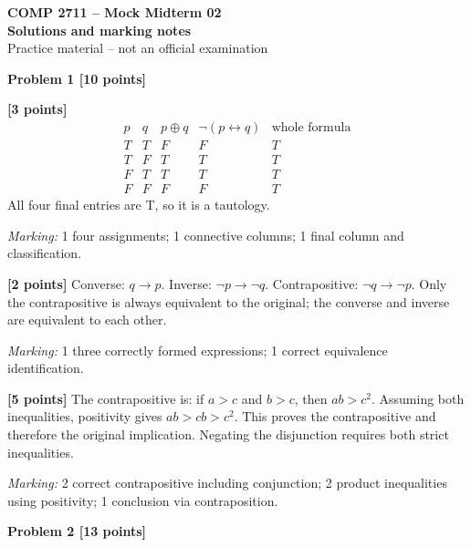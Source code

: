 \documentclass[12pt,letterpaper]{article}
\newcommand{\problemheading}[2][5\baselineskip]{\Needspace{#1}\par\noindent\hspace*{-0.625in}\textbf{#2}\par\nobreak\vspace{0.3em}}
\begin{document}
\begin{center}\textbf{COMP 2711 -- Mock Midterm 02}\\{\large\bfseries Solutions and marking notes}\\Practice material -- not an official examination\end{center}\vspace{0.5em}
\problemheading[\dimexpr 3\baselineskip+4\baselineskip\relax]{Problem 1 [10 points]}
\begin{description}[font=\normalfont,leftmargin=1.2em,labelsep=0.4em]
\item[(a)] \textbf{[3 points]} \[\begin{array}{cc|cc|c}p&q&p\oplus q&\neg(p\leftrightarrow q)&\text{whole formula}\\\hline T&T&F&F&T\\T&F&T&T&T\\F&T&T&T&T\\F&F&F&F&T\end{array}\] All four final entries are T, so it is a tautology.
\par\textit{Marking:} 1 four assignments; 1 connective columns; 1 final column and classification.
\item[(b)] \textbf{[2 points]} Converse: $q\to p$. Inverse: $\neg p\to\neg q$. Contrapositive: $\neg q\to\neg p$. Only the contrapositive is always equivalent to the original; the converse and inverse are equivalent to each other.
\par\textit{Marking:} 1 three correctly formed expressions; 1 correct equivalence identification.
\item[(c)] \textbf{[5 points]} The contrapositive is: if $a>c$ and $b>c$, then $ab>c^2$. Assuming both inequalities, positivity gives $ab>cb>c^2$. This proves the contrapositive and therefore the original implication. Negating the disjunction requires both strict inequalities.
\par\textit{Marking:} 2 correct contrapositive including conjunction; 2 product inequalities using positivity; 1 conclusion via contraposition.
\end{description}
\vspace{0.65em}
\problemheading[\dimexpr 3\baselineskip+4\baselineskip\relax]{Problem 2 [13 points]}
\end{document}
